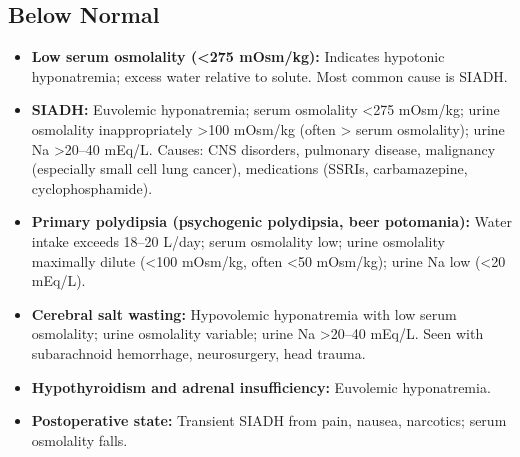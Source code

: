 \subsection*{Below Normal}
\begin{itemize}
  \item \textbf{Low serum osmolality (<275 mOsm/kg):} Indicates hypotonic hyponatremia; excess water relative to solute. Most common cause is SIADH.
  \item \textbf{SIADH:} Euvolemic hyponatremia; serum osmolality <275 mOsm/kg; urine osmolality inappropriately >100 mOsm/kg (often > serum osmolality); urine Na >20--40 mEq/L. Causes: CNS disorders, pulmonary disease, malignancy (especially small cell lung cancer), medications (SSRIs, carbamazepine, cyclophosphamide).
  \item \textbf{Primary polydipsia (psychogenic polydipsia, beer potomania):} Water intake exceeds 18--20 L/day; serum osmolality low; urine osmolality maximally dilute (<100 mOsm/kg, often <50 mOsm/kg); urine Na low (<20 mEq/L).
  \item \textbf{Cerebral salt wasting:} Hypovolemic hyponatremia with low serum osmolality; urine osmolality variable; urine Na >20--40 mEq/L. Seen with subarachnoid hemorrhage, neurosurgery, head trauma.
  \item \textbf{Hypothyroidism and adrenal insufficiency:} Euvolemic hyponatremia.
  \item \textbf{Postoperative state:} Transient SIADH from pain, nausea, narcotics; serum osmolality falls.
\end{itemize}

